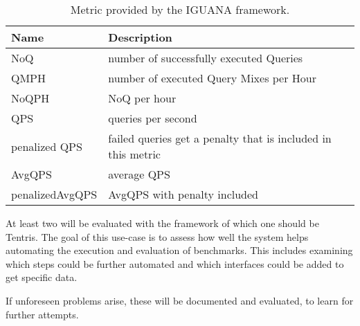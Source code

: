 \begin{table}[tbhp]
	\begin{tabular}{lp{10cm}}
		\toprule
		Name            & Description                                                  \\ \midrule
		NoQ             & number of successfully executed Queries                      \\
		QMPH            & number of executed Query Mixes per Hour                      \\
		NoQPH           & NoQ per hour                                                 \\
		QPS             & queries per second                                           \\
		penalized QPS   & failed queries get a penalty that is included in this metric \\
		AvgQPS          & average QPS                                                  \\
		penalizedAvgQPS & AvgQPS with penalty included                                 \\ \bottomrule
	\end{tabular}
	\caption{Metric provided by the IGUANA framework\cite{MetricsIguanaDocumentation}.}
	\label{table:iguana_metrics}
\end{table}


At least two \tsp{} will be evaluated with the framework of which one should be Tentris\cite{bigerlTentrisTensorBasedTriple2020}.
The goal of this use-case is to assess how well the system helps automating the execution and evaluation of benchmarks.
This includes examining which steps could be further automated and which interfaces could be added to get specific data.

If unforeseen problems arise, these will be documented and evaluated, to learn for further attempts.





%
%
%
